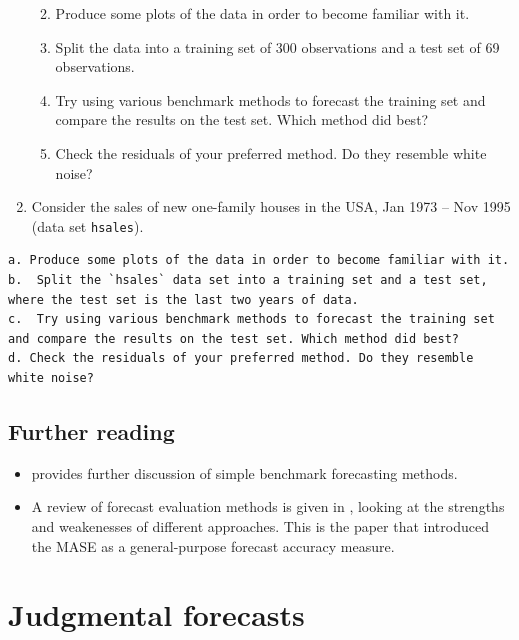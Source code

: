 \documentclass[]{book}
\providecommand{\tightlist}{%
  \setlength{\itemsep}{0pt}\setlength{\parskip}{0pt}}
\begin{document}
\begin{enumerate}
  \begin{enumerate}
  \def\labelenumii{\alph{enumii}.}
  \tightlist
  \item
    Produce some plots of the data in order to become familiar with it.
  \item
    Split the data into a training set of 300 observations and a test set of 69 observations.
  \item
    Try using various benchmark methods to forecast the training set and compare the results on the test set. Which method did best?
  \item
    Check the residuals of your preferred method. Do they resemble white noise?
  \end{enumerate}
\item
  Consider the sales of new one-family houses in the USA, Jan 1973 -- Nov 1995 (data set \texttt{hsales}).
\end{enumerate}

\begin{verbatim}
a. Produce some plots of the data in order to become familiar with it.
b.  Split the `hsales` data set into a training set and a test set, where the test set is the last two years of data.
c.  Try using various benchmark methods to forecast the training set and compare the results on the test set. Which method did best?
d. Check the residuals of your preferred method. Do they resemble white noise?
\end{verbatim}

\hypertarget{further-reading-2}{%
\section{Further reading}\label{further-reading-2}}

\begin{itemize}
\tightlist
\item
  \citet{Ord2012} provides further discussion of simple benchmark forecasting methods.
\item
  A review of forecast evaluation methods is given in \citet{HK06}, looking at the strengths and weakenesses of different approaches. This is the paper that introduced the MASE as a general-purpose forecast accuracy measure.
\end{itemize}

\hypertarget{ch-judgmental}{%
\chapter{Judgmental forecasts}\label{ch-judgmental}}
\end{document}
